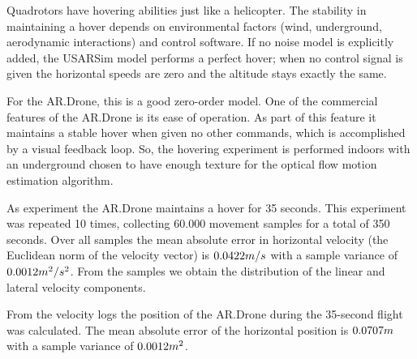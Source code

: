 Quadrotors have hovering abilities just like a helicopter. The stability in maintaining a hover depends
on environmental factors (wind, underground, aerodynamic interactions) and control software.
If no noise model is explicitly added, the USARSim model performs a perfect hover; when no control signal is given the
horizontal speeds are zero and the altitude stays exactly the same.

For the AR.Drone, this is a good zero-order model. One of the commercial features of the AR.Drone is its ease of operation. As part of this feature it
maintains a stable hover when given no other commands, which is accomplished by a visual feedback loop.
So, the hovering experiment is performed  
indoors
with an underground chosen to have enough texture for the optical flow motion estimation algorithm.

As experiment the AR.Drone maintains a hover for 35 seconds. This experiment was repeated 10 times,
collecting 60.000 movement samples for a total of 350 seconds. Over all samples the mean absolute error in horizontal
velocity (the Euclidean norm of the velocity vector) is $0.0422\small{m/s}$ with a sample variance of $0.0012\small{m^2/s^2}$. From
the samples we obtain the distribution of the linear and lateral velocity components. 

From the velocity logs the position of the AR.Drone during the 35-second 
flight was calculated. 
The mean absolute error of the horizontal position is $0.0707\small{m}$ with a sample variance of $0.0012\small{m^2}$.

